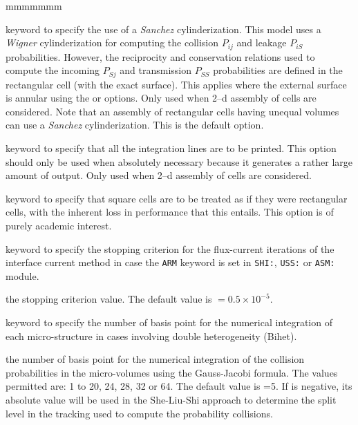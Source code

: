 \begin{ListeDeDescription}{mmmmmmm}
\item[\moc{SANC}] keyword to specify the use of a {\sl Sanchez} cylinderization.
This model uses a {\sl Wigner} cylinderization for computing the collision $P_{ij}$
and leakage $P_{iS}$ probabilities. However, the reciprocity and conservation
relations used to compute the incoming $P_{Sj}$ and transmission $P_{SS}$
probabilities are defined in the rectangular cell (with the exact
surface).\cite{SANCHEZ} 
This applies where the external surface is annular using the  or
 options. Only used when 2--d assembly of cells are considered. Note
that an assembly of rectangular cells having unequal volumes can use a
{\sl Sanchez} cylinderization. This is the default option.

\item[\moc{LIGN}] keyword to specify that all the integration lines are to be
printed. This option should only be used when absolutely necessary because it
generates a rather large amount of output. Only used when 2--d assembly of cells
are considered.

\item[\moc{RECT}] keyword to specify that square cells are to be treated as if
they were rectangular cells, with the inherent loss in performance that this
entails. This option is of purely academic interest.

\item[\moc{EPSJ}] keyword to specify the stopping criterion for the flux-current iterations of the
interface current method in case the {\tt ARM} keyword is set in {\tt SHI:}, {\tt USS:} or {\tt ASM:} module.

\item[\dusa{epsj}] the stopping criterion value. The default value is  $= 0.5 \times 10^{-5}$.

\item[\moc{QUAB}] keyword to specify the number of basis point for the
numerical integration of each micro-structure in cases involving double
heterogeneity (Bihet).

\item[\dusa{iquab}] the number of basis point for the numerical integration of
the collision probabilities in the micro-volumes using the  Gauss-Jacobi
formula. The values permitted are: 1 to 20, 24, 28, 32 or  64. The default value
is =5. If  is negative, its absolute value will be used in the She-Liu-Shi approach to determine the split level in the tracking used to compute the probability collisions. 


\end{ListeDeDescription}
